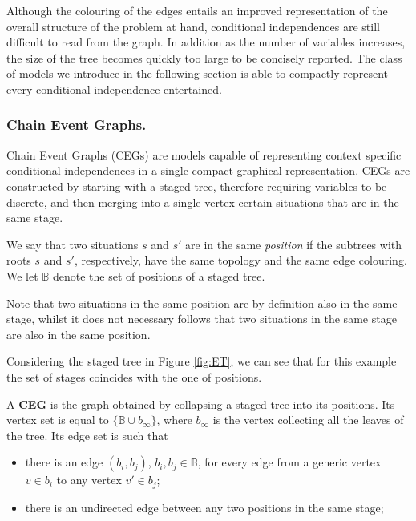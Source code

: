 Although the colouring of the edges entails an improved representation of the overall structure of the problem at hand, conditional independences are still difficult to read from the graph. In addition as the number of variables increases, the size of the tree becomes quickly too large to be concisely reported. The class of models we introduce in the following section is able to compactly represent every conditional independence entertained.

\subsubsection{Chain Event Graphs.}
\label{sec:CEG}

Chain Event Graphs (CEGs) \citep{Smith2008} are models capable of representing context specific conditional independences in a single compact graphical representation. CEGs are constructed by starting with a staged tree, therefore requiring variables to be discrete, and then merging into a single vertex certain situations that are in the same stage. 

\begin{definition}
We say that two situations $s$ and $s'$ are in the same \emph{position} if the subtrees with roots $s$ and ${s'}$, respectively, have the same topology and the same edge colouring. We let $\mathbb{B}$ denote the set of positions of a staged tree.
\end{definition}

Note that two situations in the same position are by definition also in the same stage, whilst it does not necessary follows that two situations in the same stage are also in the same position. 

\begin{example}
 Considering the staged tree in Figure \ref{fig:ET}, we can see that for this example the set of stages coincides with the one of positions. 
\end{example} 
 
 \begin{definition}
 A \textbf{CEG} is the graph obtained by collapsing a staged tree into its positions. Its vertex set is equal to $\{\mathbb{B}\cup b_{\infty}\}$, where $b_{\infty}$ is the vertex collecting all the leaves of the tree. Its edge set is such that 
 \begin{itemize}
 \item there is an edge $(b_i,b_j)$, $b_i,b_j\in\mathbb{B}$, for every edge from a generic vertex $v\in b_i$ to any vertex $v'\in b_j$;
 \item there is an undirected edge between any two positions in the same stage;
 \end{itemize}
 \end{definition} 
 
